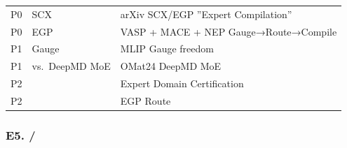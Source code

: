 \documentclass[
  12pt,
]{article}
\begin{document}
\begin{longtable}[]{@{}
  >{\centering\arraybackslash}p{}
  >{\raggedright\arraybackslash}p{}
  >{\raggedright\arraybackslash}p{}@{}}
\toprule\noalign{}
\begin{minipage}[b]{\linewidth}\centering

\end{minipage} & \begin{minipage}[b]{\linewidth}\raggedright

\end{minipage} & \begin{minipage}[b]{\linewidth}\raggedright

\end{minipage} \\
\midrule\noalign{}
\endhead
\bottomrule\noalign{}
\endlastfoot
P0 & SCX  &  arXiv  SCX/EGP ''Expert
Compilation'' \\
P0 &  EGP  &  VASP + MACE + NEP 
Gauge→Route→Compile  \\
P1 & Gauge  &  MLIP Gauge freedom
 \\
P1 &  vs.~DeepMD MoE  &  OMat24 
DeepMD MoE  \\
P2 &  &  Expert Domain Certification  \\
P2 &  &  EGP  Route  \\
\end{longtable}

\subsubsection{E5.
/}\label{e5.-ux7adeux4e89ux65b9ux6cd5ux80ccux540eux7684ux56e2ux961fux7ec4ux7ec7}
\end{document}

